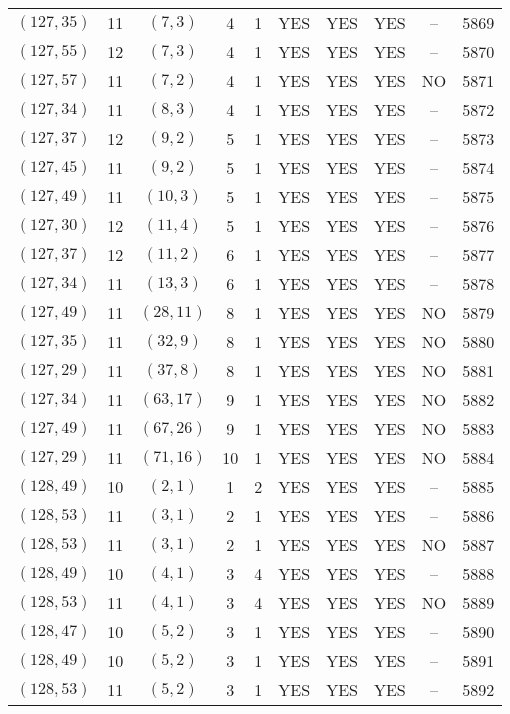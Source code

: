 \begin{longtable}{|c|c|c|c|c|c|c|c|c|c|}
$(127, 35)$ & 11 & $(7, 3)$ & 4 & 1 & YES & YES & YES & -- & 5869\\
$(127, 55)$ & 12 & $(7, 3)$ & 4 & 1 & YES & YES & YES & -- & 5870\\
$(127, 57)$ & 11 & $(7, 2)$ & 4 & 1 & YES & YES & YES & NO & 5871\\
$(127, 34)$ & 11 & $(8, 3)$ & 4 & 1 & YES & YES & YES & -- & 5872\\
$(127, 37)$ & 12 & $(9, 2)$ & 5 & 1 & YES & YES & YES & -- & 5873\\
$(127, 45)$ & 11 & $(9, 2)$ & 5 & 1 & YES & YES & YES & -- & 5874\\
$(127, 49)$ & 11 & $(10, 3)$ & 5 & 1 & YES & YES & YES & -- & 5875\\
$(127, 30)$ & 12 & $(11, 4)$ & 5 & 1 & YES & YES & YES & -- & 5876\\
$(127, 37)$ & 12 & $(11, 2)$ & 6 & 1 & YES & YES & YES & -- & 5877\\
$(127, 34)$ & 11 & $(13, 3)$ & 6 & 1 & YES & YES & YES & -- & 5878\\
$(127, 49)$ & 11 & $(28, 11)$ & 8 & 1 & YES & YES & YES & NO & 5879\\
$(127, 35)$ & 11 & $(32, 9)$ & 8 & 1 & YES & YES & YES & NO & 5880\\
$(127, 29)$ & 11 & $(37, 8)$ & 8 & 1 & YES & YES & YES & NO & 5881\\
$(127, 34)$ & 11 & $(63, 17)$ & 9 & 1 & YES & YES & YES & NO & 5882\\
$(127, 49)$ & 11 & $(67, 26)$ & 9 & 1 & YES & YES & YES & NO & 5883\\
$(127, 29)$ & 11 & $(71, 16)$ & 10 & 1 & YES & YES & YES & NO & 5884\\
$(128, 49)$ & 10 & $(2, 1)$ & 1 & 2 & YES & YES & YES & -- & 5885\\
$(128, 53)$ & 11 & $(3, 1)$ & 2 & 1 & YES & YES & YES & -- & 5886\\
$(128, 53)$ & 11 & $(3, 1)$ & 2 & 1 & YES & YES & YES & NO & 5887\\
$(128, 49)$ & 10 & $(4, 1)$ & 3 & 4 & YES & YES & YES & -- & 5888\\
$(128, 53)$ & 11 & $(4, 1)$ & 3 & 4 & YES & YES & YES & NO & 5889\\
$(128, 47)$ & 10 & $(5, 2)$ & 3 & 1 & YES & YES & YES & -- & 5890\\
$(128, 49)$ & 10 & $(5, 2)$ & 3 & 1 & YES & YES & YES & -- & 5891\\
$(128, 53)$ & 11 & $(5, 2)$ & 3 & 1 & YES & YES & YES & -- & 5892\\

\end{longtable}
